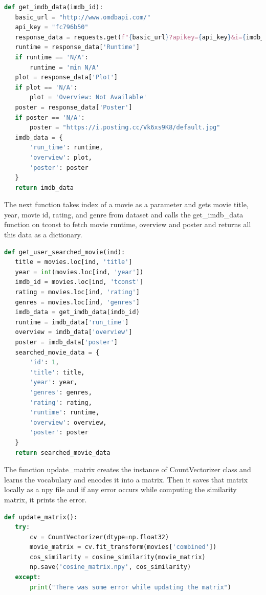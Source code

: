 \begin{lstlisting}[language=python]
def get_imdb_data(imdb_id):
   basic_url = "http://www.omdbapi.com/"
   api_key = "fc796b50"
   response_data = requests.get(f"{basic_url}?apikey={api_key}&i={imdb_id}").json()
   runtime = response_data['Runtime']
   if runtime == 'N/A':
       runtime = 'min N/A'
   plot = response_data['Plot']
   if plot == 'N/A':
       plot = 'Overview: Not Available'
   poster = response_data['Poster']
   if poster == 'N/A':
       poster = "https://i.postimg.cc/Vk6xs9K8/default.jpg"
   imdb_data = {
       'run_time': runtime,
       'overview': plot,
       'poster': poster
   }
   return imdb_data
\end{lstlisting}

The next function takes index of a movie as a parameter and gets movie title, year, movie id, rating, and genre from dataset and calls the get\_imdb\_data function on tconst to fetch movie runtime, overview and poster and returns all this data as a dictionary.

\begin{lstlisting}[language=python]
def get_user_searched_movie(ind):
   title = movies.loc[ind, 'title']
   year = int(movies.loc[ind, 'year'])
   imdb_id = movies.loc[ind, 'tconst']
   rating = movies.loc[ind, 'rating']
   genres = movies.loc[ind, 'genres']
   imdb_data = get_imdb_data(imdb_id)
   runtime = imdb_data['run_time']
   overview = imdb_data['overview']
   poster = imdb_data['poster']
   searched_movie_data = {
       'id': 1,
       'title': title,
       'year': year,
       'genres': genres,
       'rating': rating,
       'runtime': runtime,
       'overview': overview,
       'poster': poster
   }
   return searched_movie_data
\end{lstlisting}

The function update\_matrix creates the instance of CountVectorizer class and learns the vocabulary and encodes it into a matrix. Then it saves that matrix locally as a npy file and if any error occurs while computing the similarity matrix, it prints the error. 

\begin{lstlisting}[language=python]
def update_matrix():
   try:
       cv = CountVectorizer(dtype=np.float32)
       movie_matrix = cv.fit_transform(movies['combined'])
       cos_similarity = cosine_similarity(movie_matrix)
       np.save('cosine_matrix.npy', cos_similarity)
   except:
       print("There was some error while updating the matrix")
\end{lstlisting}

